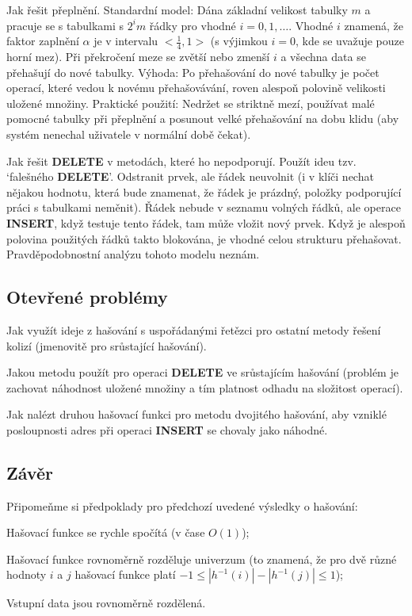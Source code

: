 \documentclass[a4paper,12pt]{article}
\begin{document}
Jak řešit přeplnění.\newline 
Standardní model: Dána základní velikost tabulky $m$ a 
pracuje se s tabulkami s $2^im$ řádky pro vhodné 
$i=0,1,\dots$. Vhodné $i$ znamená, že faktor zaplnění $
\alpha$ je v 
intervalu $<\frac 14,1>$ (s výjimkou $i=0$, kde se uvažuje 
pouze horní mez). Při překro\-če\-ní meze se zvětší nebo 
zmenší $i$ a všechna data se přehašují do nové 
tabulky.\newline 
Výhoda: Po přehašování do nové tabulky je počet operací, 
které vedou k novému přehašová\-vá\-ní, roven alespoň polovině 
velikosti uložené množiny.\newline 
Praktické použití: Nedržet se striktně mezí, používat 
malé pomocné ta\-bul\-ky při přeplnění a posunout velké 
přehašování na dobu klidu (aby systém nenechal uživatele v 
normální době čekat).

Jak řešit {\bf DELETE} v metodách, které ho 
nepodporují.\newline 
Použít ideu tzv. `falešného {\bf DELETE}'. 
Odstranit prvek, ale řádek neuvolnit (i v klíči nechat 
nějakou hodnotu, která bude znamenat, že řádek je 
prázdný, položky podporující práci s tabulkami neměnit). 
Řádek nebude v seznamu volných řádků, ale 
operace {\bf INSERT}, když testuje tento řádek, tam 
může vložit nový prvek. Když je alespoň 
polovina použitých řádků takto blokována, je 
vhodné celou strukturu přehašovat. Prav\-děpodobnostní 
analýzu tohoto modelu neznám.

\subsection{
Otevřené problémy
}

Jak využít ideje z hašování s uspořádanými 
řetězci pro ostatní metody řešení kolizí 
(jmeno\-vitě pro srůstající hašování).

Jakou metodu použít pro operaci {\bf DELETE} ve 
srůstajícím hašování (problém je zachovat náhodnost 
uložené množiny a tím platnost odhadu na složitost operací). 

Jak nalézt druhou hašovací funkci pro metodu 
dvojitého hašo\-vá\-ní, aby vzniklé posloupnosti adres při operaci 
{\bf INSERT} se chovaly jako náhodné.

\subsection{
Závěr
}

Připomeňme si předpoklady pro předchozí uvedené 
výsledky o hašování:
\roster
\item
Hašovací funkce se rychle spočítá (v čase 
$O(1)$);
\item Hašovací funkce rovnoměrně rozděluje univerzum (to 
znamená, že pro dvě různé hodnoty $i$ a $j$ 
hašovací funkce platí $-1\le |h^{-1}(i)|-|h^{-1}(j)|\le 
1$); 
\item
Vstupní data jsou rovnoměrně rozdělená.
\endroster
\end{document}

